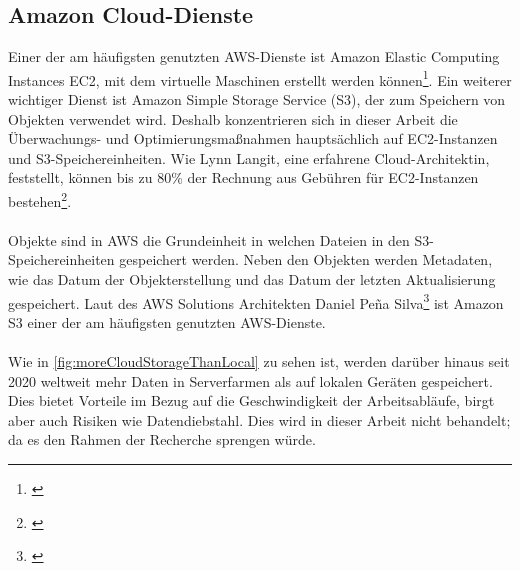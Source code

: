 \subsection{Amazon Cloud-Dienste}
Einer der am häufigsten genutzten AWS-Dienste ist Amazon Elastic Computing Instances EC2, mit dem virtuelle Maschinen erstellt werden können\footnote{\cite{STA4}}. Ein weiterer wichtiger Dienst ist Amazon Simple Storage Service (S3), der zum Speichern von Objekten verwendet wird. Deshalb konzentrieren sich in dieser Arbeit die Überwachungs- und Optimierungsmaßnahmen hauptsächlich auf EC2-Instanzen und S3-Speichereinheiten. %
Wie Lynn Langit, eine erfahrene Cloud-Architektin, feststellt, können bis zu 80\% der Rechnung aus Gebühren für EC2-Instanzen bestehen\footnote{\cite{LINK2}}.%
\\\\
Objekte sind in AWS die Grundeinheit in welchen Dateien in den S3-Speichereinheiten gespeichert werden. Neben den Objekten werden Metadaten, wie das Datum der Objekterstellung und das Datum der letzten Aktualisierung gespeichert. Laut 
des AWS Solutions Architekten Daniel Peña Silva\footnote{\cite{STA1}} ist Amazon S3 einer der am häufigsten genutzten AWS-Dienste.
\\\\
Wie in \autoref{fig:moreCloudStorageThanLocal} zu sehen ist, werden darüber hinaus seit 2020 weltweit mehr Daten in Serverfarmen als auf lokalen Geräten gespeichert. Dies bietet Vorteile im Bezug auf die Geschwindigkeit der Arbeitsabläufe, birgt aber auch Risiken wie Datendiebstahl. Dies wird in dieser Arbeit nicht behandelt; da es den Rahmen der Recherche sprengen würde.
